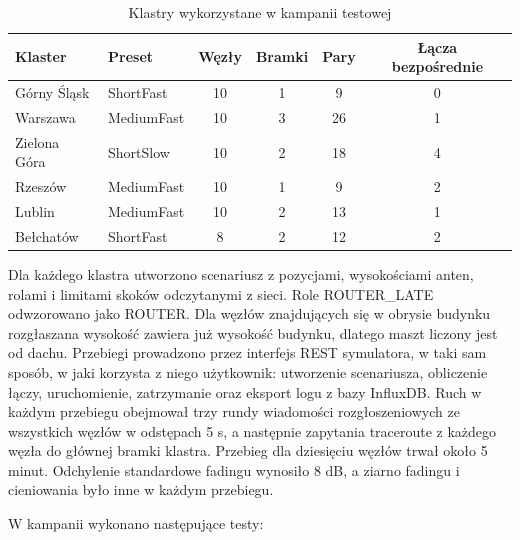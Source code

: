 \begin{table}[ht]
\centering
\caption{Klastry wykorzystane w kampanii testowej}
\label{tab:klastry}
\small
\begin{tabular}{|l|l|c|c|c|c|}
\hline
\textbf{Klaster} & \textbf{Preset} & \textbf{Węzły} & \textbf{Bramki} & \textbf{Pary} & \textbf{Łącza bezpośrednie} \\
\hline
Górny Śląsk & ShortFast & 10 & 1 & 9 & 0 \\
Warszawa & MediumFast & 10 & 3 & 26 & 1 \\
Zielona Góra & ShortSlow & 10 & 2 & 18 & 4 \\
Rzeszów & MediumFast & 10 & 1 & 9 & 2 \\
Lublin & MediumFast & 10 & 2 & 13 & 1 \\
Bełchatów & ShortFast & 8 & 2 & 12 & 2 \\
\hline
\end{tabular}
\end{table}

Dla każdego klastra utworzono scenariusz z pozycjami, wysokościami anten, rolami i limitami skoków odczytanymi z sieci. Role ROUTER\_LATE odwzorowano jako ROUTER. Dla węzłów znajdujących się w obrysie budynku rozgłaszana wysokość zawiera już wysokość budynku, dlatego maszt liczony jest od dachu. Przebiegi prowadzono przez interfejs REST symulatora, w taki sam sposób, w jaki korzysta z niego użytkownik: utworzenie scenariusza, obliczenie łączy, uruchomienie, zatrzymanie oraz eksport logu z bazy InfluxDB. Ruch w każdym przebiegu obejmował trzy rundy wiadomości rozgłoszeniowych ze wszystkich węzłów w odstępach 5 s, a następnie zapytania traceroute z każdego węzła do głównej bramki klastra. Przebieg dla dziesięciu węzłów trwał około 5 minut. Odchylenie standardowe fadingu wynosiło 8 dB, a ziarno fadingu i cieniowania było inne w każdym przebiegu.

W kampanii wykonano następujące testy:

